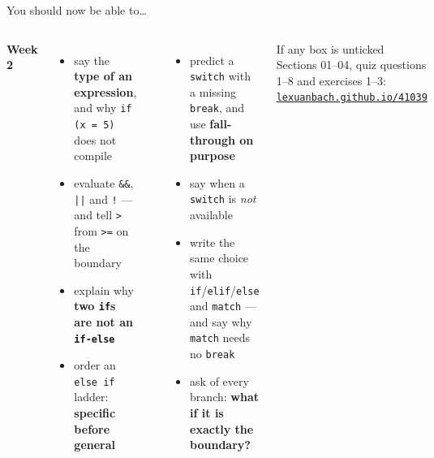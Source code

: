 \documentclass[aspectratio=169]{beamer}
\newcommand{\code}[1]{\texttt{#1}}
\newcommand{\srclink}[2]{\href{#1}{\texttt{#2}}}
\newcommand{\neutrallabel}[1]{\textcolor{bkblue}{\textbf{#1}}}
\newcommand{\yes}{\textcolor{goodgreen}{\ding{51}}}
\begin{document}
\begin{frame}{You should now be able to\ldots}
  \begin{columns}[T,onlytextwidth]
    \neutrallabel{Week 2}
    \begin{itemize}[itemsep=0.2em]
      \small
      \item[\yes] say the \textbf{type of an expression}, and why \code{if (x = 5)} does
        not compile
      \item[\yes] evaluate \code{\&\&}, \code{||} and \code{!} --- and tell \code{>} from
        \code{>=} on the boundary
      \item[\yes] explain why \textbf{two \code{if}s are not an \code{if-else}}
      \item[\yes] order an \code{else if} ladder: \textbf{specific before general}
    \end{itemize}
    \neutrallabel{\phantom{Week 2}}
    \begin{itemize}[itemsep=0.2em]
      \small
      \item[\yes] predict a \code{switch} with a missing \code{break}, and use
        \textbf{fall-through on purpose}
      \item[\yes] say when a \code{switch} is \emph{not} available
      \item[\yes] write the same choice with \code{if}/\code{elif}/\code{else} and
        \code{match} --- and say why \code{match} needs no \code{break}
      \item[\yes] ask of every branch: \textbf{what if it is exactly the boundary?}
    \end{itemize}
    \vspace{0.3em}
    \begin{contextbox}{If any box is unticked}
      \small Sections 01--04, quiz questions 1--8 and exercises 1--3:\\
      \srclink{https://lexuanbach.github.io/41039/weeks/week-2-3.html}{lexuanbach.github.io/41039}
    \end{contextbox}
  \end{columns}
\end{frame}
\end{document}
